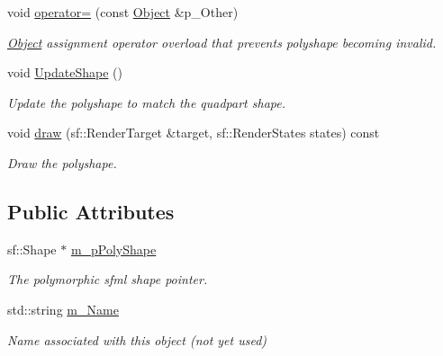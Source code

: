 \begin{DoxyCompactItemize}
void \hyperlink{class_object_aa904f948ec72f2cbec99a9eee5ed387e}{operator=} (const \hyperlink{class_object}{Object} \&p\+\_\+\+Other)
\begin{DoxyCompactList}\small\item\em \hyperlink{class_object}{Object} assignment operator overload that prevents polyshape becoming invalid. \end{DoxyCompactList}\item 
\mbox{\label{class_object_a94582e86bced7fdfebc0d419a2012272}} 
void \hyperlink{class_object_a94582e86bced7fdfebc0d419a2012272}{Update\+Shape} ()
\begin{DoxyCompactList}\small\item\em Update the polyshape to match the quadpart shape. \end{DoxyCompactList}\item 
\mbox{\label{class_object_a6c3dc18899c7d428b35b88b1474778d0}} 
void \hyperlink{class_object_a6c3dc18899c7d428b35b88b1474778d0}{draw} (sf\+::\+Render\+Target \&target, sf\+::\+Render\+States states) const
\begin{DoxyCompactList}\small\item\em Draw the polyshape. \end{DoxyCompactList}\end{DoxyCompactItemize}
\subsection*{Public Attributes}
\begin{DoxyCompactItemize}
\item 
\mbox{\label{class_object_a6f8024417f011eba14377d64b39baad4}} 
sf\+::\+Shape $\ast$ \hyperlink{class_object_a6f8024417f011eba14377d64b39baad4}{m\+\_\+p\+Poly\+Shape}
\begin{DoxyCompactList}\small\item\em The polymorphic sfml shape pointer. \end{DoxyCompactList}\item 
\mbox{\label{class_object_a90cb6e9ab5acccc06a2fa2bbc9ccf793}} 
std\+::string \hyperlink{class_object_a90cb6e9ab5acccc06a2fa2bbc9ccf793}{m\+\_\+\+Name}
\begin{DoxyCompactList}\small\item\em Name associated with this object (not yet used) \end{DoxyCompactList}\end{DoxyCompactItemize}
